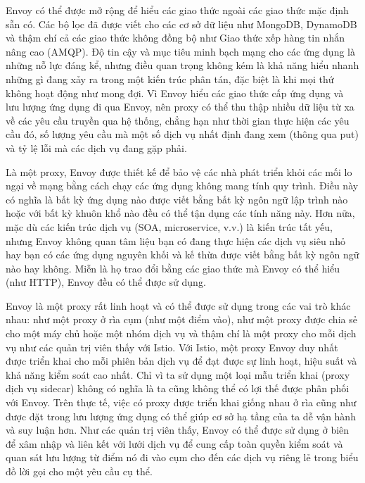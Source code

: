 \documentclass[14pt,a4paper]{book}
\begin{document}
		Envoy có thể được mở rộng để hiểu các giao thức ngoài các giao thức mặc định sẵn có. Các bộ lọc đã được viết cho các cơ sở dữ liệu như MongoDB, DynamoDB và thậm chí cả các giao thức không đồng bộ như Giao thức xếp hàng tin nhắn nâng cao (AMQP). Độ tin cậy và mục tiêu minh bạch mạng cho các ứng dụng là những nỗ lực đáng kể, nhưng điều quan trọng không kém là khả năng hiểu nhanh những gì đang xảy ra trong một kiến trúc phân tán, đặc biệt là khi mọi thứ không hoạt động như mong đợi. Vì Envoy hiểu các giao thức cấp ứng dụng và lưu lượng ứng dụng đi qua Envoy, nên proxy có thể thu thập nhiều dữ liệu từ xa về các yêu cầu truyền qua hệ thống, chẳng hạn như thời gian thực hiện các yêu cầu đó, số lượng yêu cầu mà một số dịch vụ nhất định đang xem (thông qua put) và tỷ lệ lỗi mà các dịch vụ đang gặp phải.
		
		\newpage Là một proxy, Envoy được thiết kế để bảo vệ các nhà phát triển khỏi các mối lo ngại về mạng bằng cách chạy các ứng dụng không mang tính quy trình. Điều này có nghĩa là bất kỳ ứng dụng nào được viết bằng bất kỳ ngôn ngữ lập trình nào hoặc với bất kỳ khuôn khổ nào đều có thể tận dụng các tính năng này. Hơn nữa, mặc dù các kiến trúc dịch vụ (SOA, microservice, v.v.) là kiến trúc tất yếu, nhưng Envoy không quan tâm liệu bạn có đang thực hiện các dịch vụ siêu nhỏ hay bạn có các ứng dụng nguyên khối và kế thừa được viết bằng bất kỳ ngôn ngữ nào hay không. Miễn là họ trao đổi bằng các giao thức mà Envoy có thể hiểu (như HTTP), Envoy đều có thể được sử dụng.
		
		Envoy là một proxy rất linh hoạt và có thể được sử dụng trong các vai trò khác nhau: như một proxy ở rìa cụm (như một điểm vào), như một proxy được chia sẻ cho một máy chủ hoặc một nhóm dịch vụ và thậm chí là một proxy cho mỗi dịch vụ như các quản trị viên thấy với Istio. Với Istio, một proxy Envoy duy nhất được triển khai cho mỗi phiên bản dịch vụ để đạt được sự linh hoạt, hiệu suất và khả năng kiểm soát cao nhất. Chỉ vì ta sử dụng một loại mẫu triển khai (proxy dịch vụ sidecar) không có nghĩa là ta cũng không thể có lợi thế được phân phối với Envoy. Trên thực tế, việc có proxy được triển khai giống nhau ở rìa cũng như được đặt trong lưu lượng ứng dụng có thể giúp cơ sở hạ tầng của ta dễ vận hành và suy luận hơn. Như các quản trị viên thấy, Envoy có thể được sử dụng ở biên để xâm nhập và liên kết với lưới dịch vụ để cung cấp toàn quyền kiểm soát và quan sát lưu lượng từ điểm nó đi vào cụm cho đến các dịch vụ riêng lẻ trong biểu đồ lời gọi cho một yêu cầu cụ thể.
		
\end{document}
